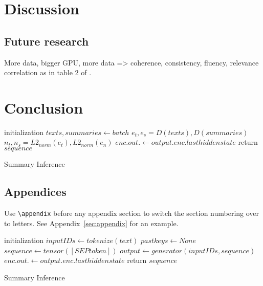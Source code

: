 \documentclass[11pt]{article}
\begin{document}

\section{Discussion} \label{Discussion}

\subsection{Future research}

More data, bigger GPU, more data => coherence, consistency, fluency, relevance correlation as in table 2 of \cite{fabbri2021summeval}.



\section{Conclusion} \label{Conclusion}


\begin{algorithm}[]
 initialization\;
 $texts, summaries \leftarrow batch$
 $e_t, e_s = D(texts), D(summaries)$
 $n_t, n_s = L2_{norm}(e_t), L2_{norm}(e_n)$
 $enc.out. \leftarrow output.enc.lasthiddenstate$\;
 return $sequence$\;
 \caption{Summary Inference}
\end{algorithm}


\subsection{Appendices}

Use \verb|\appendix| before any appendix section to switch the section numbering over to letters. See Appendix~\ref{sec:appendix} for an example.

\begin{algorithm}[]
 initialization\;
  $inputIDs \leftarrow tokenize(text)$\;
 $ pastkeys \leftarrow None$\;
 $ sequence \leftarrow tensor([SEPtoken])$ \;
 $output \leftarrow generator(inputIDs, sequence)$\;
 $enc.out. \leftarrow output.enc.lasthiddenstate$\;
 return $sequence$\;
 \caption{Summary Inference}
\end{algorithm}
\end{document}
